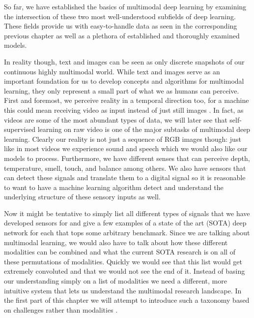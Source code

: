 \documentclass[
]{krantz}
\begin{document}
So far, we have established the basics of multimodal deep learning by examining the intersection of these two most well-understood subfields of deep learning. These fields provide us with easy-to-handle data as seen in the corresponding previous chapter as well as a plethora of established and thoroughly examined models.

In reality though, text and images can be seen as only discrete snapshots of our continuous highly multimodal world. While text and images serve as an important foundation for us to develop concepts and algorithms for multimodal learning, they only represent a small part of what we as humans can perceive. First and foremost, we perceive reality in a temporal direction too, for a machine this could mean receiving video as input instead of just still images \citep{iv2021multimodal}. In fact, as videos are some of the most abundant types of data, we will later see that self-supervised learning on raw video is one of the major subtasks of multimodal deep learning. Clearly our reality is not just a sequence of RGB images though: just like in most videos we experience sound and speech which we would also like our models to process. Furthermore, we have different senses that can perceive depth, temperature, smell, touch, and balance among others. We also have sensors that can detect these signals and translate them to a digital signal so it is reasonable to want to have a machine learning algorithm detect and understand the underlying structure of these sensory inputs as well.

Now it might be tentative to simply list all different types of signals that we have developed sensors for and give a few examples of a state of the art (SOTA) deep network for each that tops some arbitrary benchmark. Since we are talking about multimodal learning, we would also have to talk about how these different modalities can be combined and what the current SOTA research is on all of these permutations of modalities. Quickly we would see that this list would get extremely convoluted and that we would not see the end of it. Instead of basing our understanding simply on a list of modalities we need a different, more intuitive system that lets us understand the multimodal research landscape. In the first part of this chapter we will attempt to introduce such a taxonomy based on challenges rather than modalities \citep{baltrušaitis2017multimodal}.
\end{document}
